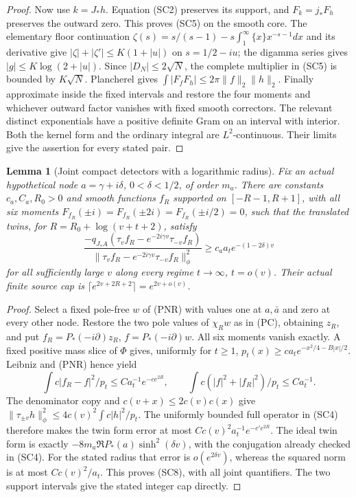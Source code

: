 \documentclass[11pt]{article}
\newtheorem{lemma}[theorem]{Lemma}
\theoremstyle{remark}\newtheorem{remark}[theorem]{Remark}
\begin{document}
\begin{proof}
Now use \(k=J_*h\). Equation (SC2) preserves its support,
and \(F_k=j_*F_h\) preserves the outward zero. This proves
(SC5) on the smooth core. The elementary floor continuation
\(\zeta(s)=s/(s-1)-s\int_1^\infty\{x\}x^{-s-1}dx\)
and its derivative give \(|\zeta|+|\zeta'|\le K(1+|u|)\)
on \(s=1/2-iu\); the digamma series gives
\(|g|\le K\log(2+|u|)\). Since \(|D_N|\le2\sqrt N\),
the complete multiplier in (SC5) is bounded by \(K\sqrt N\).
Plancherel gives \(\int|F_fF_h|\le2\pi\|f\|_2\|h\|_2\).
Finally approximate inside the fixed intervals and restore the
four moments and whichever outward factor vanishes with fixed
smooth correctors. The relevant distinct exponentials have a
positive definite Gram on an interval with interior. Both the
kernel form and the ordinary integral are \(L^2\)-continuous.
Their limits give the assertion for every stated pair.
\end{proof}

\begin{lemma}[Joint compact detectors with a logarithmic radius]
\label{lem:joint-compact-detector}
Fix an actual hypothetical node \(a=\gamma+i\delta\),
\(0<\delta<1/2\), of order \(m_a\).
There are constants \(c_a,C_a,R_0>0\) and smooth functions
\(f_R\) supported on \([-R-1,R+1]\), with all six moments
\(F_{f_R}(\pm i)=F_{f_R}(\pm2i)=F_{f_R}(\pm i/2)=0\), such
that the translated twins, for
\(R=R_0+\log(v+t+2)\), satisfy
\[
 \frac{-q_{J_*A}(\tau_vf_R-e^{-2i\gamma v}\tau_{-v}f_R)}
 {\|\tau_vf_R-e^{-2i\gamma v}\tau_{-v}f_R\|_\phi^2}
 \ge c_a a_t e^{-(1-2\delta)v}                       \tag{SC8}
\]
for all sufficiently large \(v\) along every regime
\(t\to\infty\), \(t=o(v)\).
Their actual finite source cap is
\(\lceil e^{2v+2R+2}\rceil=e^{2v+o(v)}\).
\end{lemma}
\begin{proof}
Select a fixed pole-free \(w\) of (PNR) with values one at
\(a,\bar a\) and zero at every other node. Restore the two
pole values of \(\chi_Rw\) as in (PC), obtaining \(z_R\),
and put \(f_R=P_*(-i\partial)z_R\), \(f=P_*(-i\partial)w\).
All six moments vanish exactly. A fixed positive mass slice
of \(\Phi\) gives, uniformly for \(t\ge1\),
\(p_t(x)\ge c a_t e^{-x^2/4-B|x|/2}\).
Leibniz and (PNR) hence yield
\[
 \int c|f_R-f|^2/p_t\le C a_t^{-1}e^{-c e^{2R}},\qquad
 \int c(|f|^2+|f_R|^2)/p_t\le C a_t^{-1}.          \tag{SC9}
\]
The denominator copy and \(c(v+x)\le2c(v)c(x)\) give
\(\|\tau_{\pm v}h\|_\phi^2\le4c(v)^2\int c|h|^2/p_t\).
The uniformly bounded full operator in (SC4) therefore makes
the twin form error at most
\(C c(v)^2a_t^{-1}e^{-c'e^{2R}}\).
The ideal twin form is exactly
\(-8m_a\Re P_*(a)\sinh^2(\delta v)\), with the conjugation
already checked in (SC4). For the stated radius that error is
\(o(e^{2\delta v})\), whereas the squared norm is at most
\(C c(v)^2/a_t\). This proves (SC8), with all joint quantifiers.
The two support intervals give the stated integer cap directly.
\end{proof}
\end{document}
